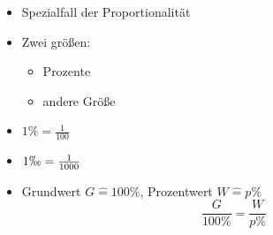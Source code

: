 \begin{itemize}
    \item Spezialfall der Proportionalität
    \item Zwei größen:\
    \begin{itemize}
        \item Prozente
        \item andere Größe
    \end{itemize}
    \item $1\% = \frac{1}{100}$
    \item $1\permil = \frac{1}{1000}$
    \item Grundwert $G \hat{=} 100\%$, Prozentwert $W \hat{=} p\%$
    $$\frac{G}{100\%} = \frac{W}{p\%}$$
\end{itemize}